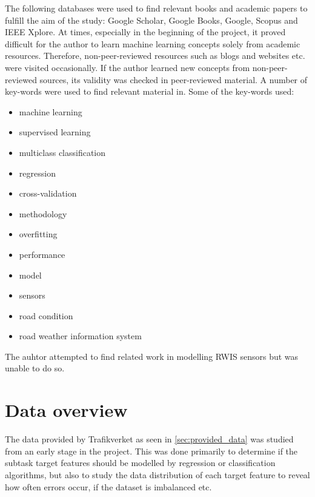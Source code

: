 	The following databases were used to find relevant books and academic papers to fulfill the aim of the study: Google Scholar, Google Books, Google, Scopus and IEEE Xplore. At times, especially in the beginning of the project, it proved difficult for the author to learn machine learning concepts solely from academic resources. Therefore, non-peer-reviewed resources such as blogs and websites etc. were visited occasionally. If the author learned new concepts from non-peer-reviewed sources, its validity was checked in peer-reviewed material. A number of key-words were used to find relevant material in. Some of the key-words used:

	\begin{itemize}
		\item machine learning
		\item supervised learning
		\item multiclass classification
		\item regression
		\item cross-validation
		\item methodology
		\item overfitting
		\item performance
		\item model
		\item sensors
		\item road condition
		\item road weather information system
	\end{itemize}

	The auhtor attempted to find related work in modelling RWIS sensors but was unable to do so.

	
\section{Data overview}
	The data provided by Trafikverket as seen in \ref{sec:provided_data} was studied from an early stage in the project. This was done primarily to determine if the subtask target features should be modelled by regression or classification algorithms, but also to study the data distribution of each target feature to reveal how often errors occur, if the dataset is imbalanced etc. 

